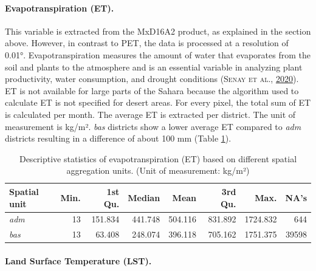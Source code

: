 \documentclass[a4paper,11pt]{article}
\begin{document}
\hypertarget{evapotranspiration-et.}{%
\paragraph{Evapotranspiration (ET).}\label{evapotranspiration-et.}}

This variable is extracted from the MxD16A2 product, as explained in the section above.
However, in contrast to PET, the data is processed at a resolution of 0.01°.
Evapotranspiration measures the amount of water that evaporates
from the soil and plants to the atmosphere and is an essential variable in analyzing
plant productivity, water consumption, and drought conditions \textsc{(\textnormal{\textsc{Senay} \textsc{et al.}}, \textnormal{\protect\hyperlink{ref-senay2020}{2020}})}. ET is
not available for large parts of the Sahara because the algorithm used to calculate
ET is not specified for desert areas. For every pixel, the total sum of
ET is calculated per month. The average ET is extracted per district.
The unit of measurement is kg/m². \emph{bas} districts show a lower average ET
compared to \emph{adm} districts resulting in a difference of about 100 mm (Table \ref{tab:02-data-et}).
\begin{table}[H]

\caption[Descriptive statistics of evapotranspiration (ET).]{\label{tab:02-data-et}Descriptive statistics of evapotranspiration (ET) based on different spatial
               aggregation units. (Unit of measurement: kg/m²)}
\centering
\fontsize{10}{12}\selectfont
\begin{tabular}[t]{lrrrrrrr}
\toprule
Spatial unit & Min. & 1st Qu. & Median & Mean & 3rd Qu. & Max. & NA's\\
\midrule
\textit{adm} & 13 & 151.834 & 441.748 & 504.116 & 831.892 & 1724.832 & 644\\
\textit{bas} & 13 & 63.408 & 248.074 & 396.118 & 705.162 & 1751.375 & 39598\\
\bottomrule
\end{tabular}
\end{table}
\hypertarget{land-surface-temperature-lst.}{%
\paragraph{Land Surface Temperature (LST).}\label{land-surface-temperature-lst.}}
\end{document}
